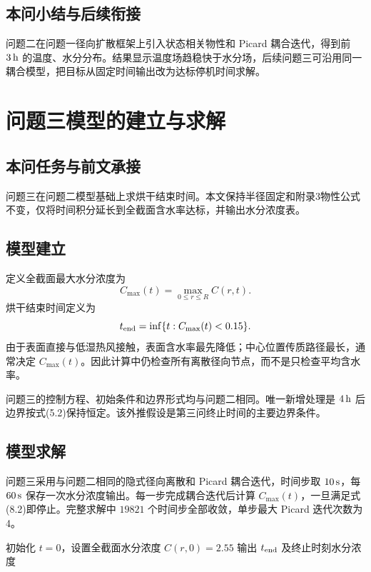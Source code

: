 \documentclass[UTF8,a4paper,12pt]{ctexart}
\numberwithin{equation}{section}
\begin{document}
\subsection{本问小结与后续衔接}
问题二在问题一径向扩散框架上引入状态相关物性和 Picard 耦合迭代，得到前 $3\rm\,h$ 的温度、水分分布。结果显示温度场趋稳快于水分场，后续问题三可沿用同一耦合模型，把目标从固定时间输出改为达标停机时间求解。

\section{问题三模型的建立与求解}
\subsection{本问任务与前文承接}
问题三在问题二模型基础上求烘干结束时间。本文保持半径固定和附录3物性公式不变，仅将时间积分延长到全截面含水率达标，并输出水分浓度表。

\subsection{模型建立}
定义全截面最大水分浓度为
\begin{equation}
  C_{\max}(t)=\max_{0\le r\le R} C(r,t).
\end{equation}
烘干结束时间定义为
\begin{equation}
  t_{\rm end}=\inf\{t:C_{\max}(t)<0.15\}.
\end{equation}
由于表面直接与低湿热风接触，表面含水率最先降低；中心位置传质路径最长，通常决定 $C_{\max}(t)$。因此计算中仍检查所有离散径向节点，而不是只检查平均含水率。

问题三的控制方程、初始条件和边界形式均与问题二相同。唯一新增处理是 $4\rm\,h$ 后边界按式(5.2)保持恒定。该外推假设是第三问终止时间的主要边界条件。

\subsection{模型求解}
问题三采用与问题二相同的隐式径向离散和 Picard 耦合迭代，时间步取 $10\rm\,s$，每 $60\rm\,s$ 保存一次水分浓度输出。每一步完成耦合迭代后计算 $C_{\max}(t)$，一旦满足式(8.2)即停止。完整求解中 $19821$ 个时间步全部收敛，单步最大 Picard 迭代次数为 4。

\begin{algorithm}[H]
  \SetAlgoLined
  初始化 $t=0$，设置全截面水分浓度 $C(r,0)=2.55$\;
  输出 $t_{\rm end}$ 及终止时刻水分浓度\;
  \caption{问题三达标停机求解流程}
\end{algorithm}
\end{document}
